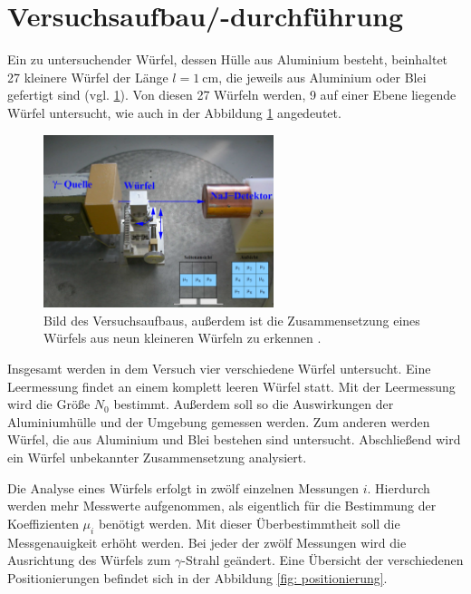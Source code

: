 \section{Versuchsaufbau/-durchführung}
Ein zu untersuchender Würfel, dessen Hülle aus Aluminium besteht, beinhaltet 27 kleinere Würfel der Länge $l=\SI{1}{\centi\meter}$,
die jeweils aus Aluminium oder Blei gefertigt sind (vgl. \ref{fig: aufbau}).
Von diesen 27 Würfeln werden, 9 auf einer Ebene liegende Würfel untersucht, wie auch in der Abbildung \ref{fig: aufbau} angedeutet.

\begin{figure}[h]
  \centering
  \includegraphics[width=0.6\textwidth]{pics/Aufbau.pdf}
  \caption{Bild des Versuchsaufbaus, außerdem ist die Zusammensetzung eines Würfels aus neun kleineren Würfeln zu erkennen \cite{anleitungb14}.}
  \label{fig: aufbau}
\end{figure}

Insgesamt werden in dem Versuch vier verschiedene Würfel untersucht. Eine Leermessung findet an
einem komplett leeren Würfel statt. Mit der Leermessung wird die Größe $N_0$ bestimmt. %
Außerdem soll so die Auswirkungen der Aluminiumhülle und der Umgebung gemessen werden.
Zum anderen werden Würfel, die aus Aluminium und Blei bestehen sind untersucht.
Abschließend wird ein Würfel unbekannter Zusammensetzung analysiert.


Die Analyse eines Würfels erfolgt in zwölf einzelnen Messungen $i$. %
Hierdurch werden mehr Messwerte aufgenommen, als eigentlich für die Bestimmung der Koeffizienten $\mu_i$
benötigt werden. Mit dieser Überbestimmtheit soll die Messgenauigkeit erhöht werden.
Bei jeder der zwölf Messungen wird die Ausrichtung des Würfels zum $\gamma$-Strahl geändert.%
Eine Übersicht der verschiedenen Positionierungen befindet sich in der Abbildung \ref{fig: positionierung}.

